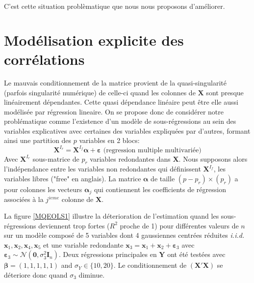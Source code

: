 \documentclass[12pt,a4paper]{report}
\begin{document}
	C'est cette situation problèmatique que nous nous proposons d'améliorer.
	\section{Modélisation explicite des corrélations}
	Le mauvais conditionnement de la matrice provient de la quasi-singularité (parfois singularité numérique) de celle-ci quand les colonnes de $\boldsymbol{X}$ sont presque linéairement dépendantes.	Cette quasi dépendance linéaire peut être elle aussi modélisée par régression lineaire. On se propose donc de considérer notre problématique comme l'existence d'un modèle de sous-régressions au sein des variables explicatives avec certaines des variables expliquées par d'autres, formant ainsi une partition des $p$ variables en 2 blocs:
	\begin{equation}
		\boldsymbol{X}^{I_r}=\boldsymbol{X}^{I_f}\boldsymbol{\alpha}+\boldsymbol{\varepsilon} \textrm{ \ \ \ (regression multiple multivariée)}
	\end{equation}
	Avec $\boldsymbol{X}^{I_r}$ sous-matrice de $p_r$ variables redondantes dans $\boldsymbol{X}$. Nous supposons alors l'indépendance entre les variables non redondantes qui définissent $\boldsymbol{X}^{I_f}$, les variables libres ("free" en anglais). La matrice $\boldsymbol{\alpha}$ de taille $(p-p_r)\times (p_r)$ a pour colonnes les vecteurs $\boldsymbol{\alpha}_j$ qui contiennent les coefficients de régression associées à la $j^{ieme}$ colonne de $\boldsymbol{X}$.
	
	La figure \ref{MQEOLS1} illustre la déterioration de l'estimation quand les sous-régressions deviennent trop fortes ($R^2$ proche de 1) pour différentes valeurs de $n$ sur un modèle composé de 5 variables dont 4 gaussiennes centrées réduites {\it i.i.d. } $\boldsymbol{x}_1,\boldsymbol{x}_2,\boldsymbol{x}_4,\boldsymbol{x}_5$ et une variable redondante $\boldsymbol{x}_3=\boldsymbol{x}_1+\boldsymbol{x}_2+\boldsymbol{\varepsilon}_3$ avec $\boldsymbol{\varepsilon}_3\sim{\mathcal{N}(\boldsymbol{0},\sigma_3^2\boldsymbol{I}_n)}$. Deux régressions principales en $\boldsymbol{Y}$ ont été testées avec $\boldsymbol{\beta}=(1,1,1,1,1)$ and $\sigma_Y \in \{10,20\}$. Le conditionnement de $(\boldsymbol{X}'\boldsymbol{X})$ se déteriore donc quand $\sigma_3$ diminue. \\
	
\end{document}

